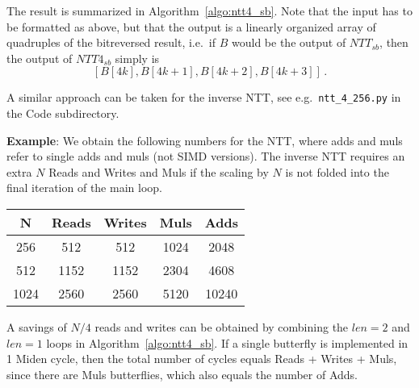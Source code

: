 The result is summarized in Algorithm~\ref{algo:ntt4_sb}.  Note that the input has to be formatted as above, 
but that the output is a linearly organized array of quadruples of the bitreversed result, i.e.\ if 
$B$ would be the output of $NTT_{sb}$, then the output of $NTT4_{sb}$ simply is 
\[ [B[4k], B[4k+1], B[4k+2], B[4k+3]] \, . \]

A similar approach can be taken for the inverse NTT, see e.g.\ \texttt{ntt\_4\_256.py} in the Code subdirectory.

\textbf{Example}: We obtain the following numbers for the NTT, where adds and muls refer to single adds and muls (not SIMD versions).
The inverse NTT requires an extra $N$ Reads and Writes and Muls if the scaling by $N$ is not folded into the final iteration
of the main loop.
\begin{center}
\begin{tabular}{|c|c|c|c|c|} 
\hline
N & Reads & Writes &  Muls & Adds \\
\hline
256 & 512 & 512 & 1024 & 2048   \\
512 & 1152 & 1152 & 2304  & 4608 \\
1024 & 2560 & 2560 &  5120 & 10240 \\
\hline
\end{tabular}
\end{center}

A savings of $N/4$ reads and writes can be obtained by combining the $len=2$ and $len=1$ loops in
Algorithm~\ref{algo:ntt4_sb}.
If a single butterfly is implemented in 1 Miden cycle, then the total number of cycles equals Reads + Writes + Muls, 
since there are Muls butterflies, which also equals the number of Adds.


